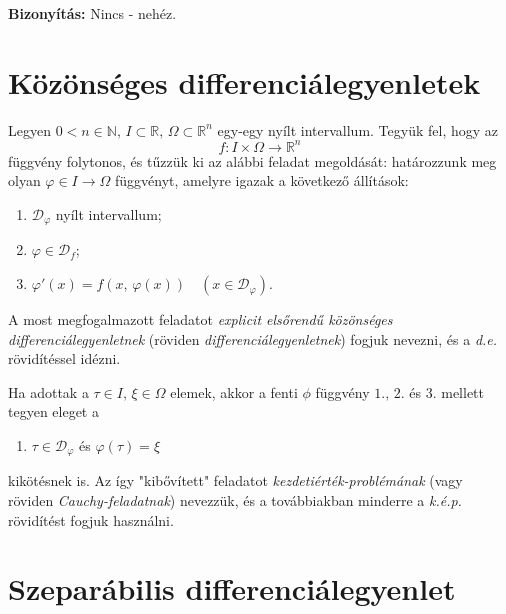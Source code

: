 \documentclass[12pt]{article}
\newcommand{\R}{\mathbb{R}}
\newcommand{\N}{\mathbb{N}}
\newcommand{\D}{\mathcal{D}_f}
\begin{document}
    \textbf{Bizonyítás:} Nincs - nehéz.

    \newpage
    \section{Közönséges differenciálegyenletek}
    Legyen $0 < n \in \N, \, I \subset \R, \, \Omega \subset \R^n$ egy-egy nyílt intervallum. Tegyük fel, hogy az
    \[
        f : I \times \Omega \to \R^n
    \]
    függvény folytonos, és tűzzük ki az alábbi feladat megoldását: határozzunk meg olyan $\varphi \in I \to \Omega$ függvényt, amelyre igazak a következő állítások:

    \begin{enumerate}
        \item $\mathcal{D}_\varphi$ nyílt intervallum;
        \item $\varphi \in \D$;
        \item $\varphi'(x) = f(x, \, \varphi(x)) \quad (x \in \mathcal{D}_\varphi)$.
    \end{enumerate}

    A most megfogalmazott feladatot \textit{explicit elsőrendű közönséges differenciálegyenletnek} (röviden \textit{differenciálegyenletnek}) fogjuk nevezni, és a \textit{d.e.} rövidítéssel idézni.\newline

    Ha adottak a $\tau \in I, \, \xi \in \Omega$ elemek, akkor a fenti $\phi$ függvény $1., \, 2.$ és $3.$ mellett tegyen eleget a
    \begin{enumerate}[start=4]
        \item $\tau \in \mathcal{D}_\varphi$ és $\varphi(\tau) = \xi$
    \end{enumerate}
    kikötésnek is. Az így "kibővített" feladatot \textit{kezdetiérték-problémának} (vagy röviden \textit{Cauchy-feladatnak}) nevezzük, és a továbbiakban minderre a \textit{k.é.p.} rövidítést fogjuk használni. 

    \section{Szeparábilis differenciálegyenlet}
\end{document}
